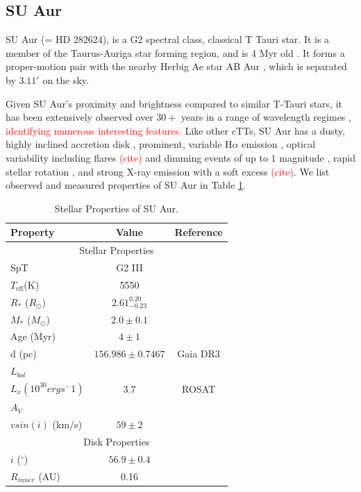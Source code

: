 \documentclass[twocolumn]{aastex631}
\renewcommand\deg{\ensuremath{^\circ}}
\newcommand\halpha{\ensuremath{{\text{H}\alpha}}}
\newcommand{\teff}{\ensuremath{T_{\text{eff}}}}
\newcommand{\citesomething}[1]{\textcolor{red}{(cite#1)}}
\newcommand{\red}[1]{\textcolor{red}{#1}}
\begin{document}
\subsection{SU Aur}
SU Aur (= HD 282624), is a G2 spectral class, classical T Tauri star. It is a member of the Taurus-Auriga star forming region, and is 4 Myr old \citep[e.g.][]{dewarf_intrinsic_2003}. It forms a proper-motion pair with the nearby Herbig Ae star AB Aur \citep{dewarf_intrinsic_2003}, which is separated by $3.11'$ on the sky.

Given SU Aur's proximity and brightness compared to similar T-Tauri stars, it has been extensively observed over $30+$ years in a range of wavelength regimes \citep[e.g.][]{giampapa_synoptic_1993, dewarf_intrinsic_2003, robrade_xmm-newton_2006, labdon_dusty_2019, labdon_imaging_2023}, \red{identifying numerous interesting features.} Like other cTTs, SU Aur has a dusty, highly inclined accretion disk \citep{akeson_observations_2005, labdon_dusty_2019, labdon_imaging_2023}, prominent, variable \halpha{} emission \citep[e.g.][]{giampapa_synoptic_1993}, optical variability including flares \citesomething{} and dimming events of up to $1$ magnitude \citep[e.g.][]{dewarf_stromgren_1998, grankin_su_aur_2018}, rapid stellar rotation \citep[e.g.][]{giampapa_synoptic_1993, unruh_multisite_2004}, and strong X-ray emission with a soft excess \citesomething{}. We list observed and measured properties of SU Aur in Table \ref{table:su_aur_properties}. 
    
\begin{table}[ht!]
    \centering
    \begin{tabular}{|l|c|c|}
    \hline
    Property & Value & Reference \\
    \hline
    \multicolumn{3}{|c|}{Stellar Properties}\\
    \hline
    SpT & G2 III & \cite{dewarf_intrinsic_2003} \\
    \teff (K) & 5550 & \cite{dewarf_intrinsic_2003} \\ 
    $R_*$ ($R_\odot$) & $2.61^{0.20}_{-0.23}$ & \cite{dewarf_intrinsic_2003} \\
    $M_*$ ($M_\odot$) & $2.0 \pm 0.1 $ & \cite{dewarf_intrinsic_2003} \\
    Age (Myr) & $4 \pm 1$ & \cite{dewarf_intrinsic_2003}\\
    d (pc) & $156.986 \pm 0.7467$ & Gaia DR3\\
    $L_{bol}$ & & \\
    $L_x (10^{30} erg s^-{1})$ & 3.7 & ROSAT \\
    $A_V$ & & \\
    $vsin(i)$ (km/s) & $59\pm2$ & \citet{nguyen_close_2012} \\
    \hline
    \multicolumn{3}{|c|}{Disk Properties} \\
    \hline
    $i$ (\deg) & $56.9 \pm 0.4$ & \cite{labdon_imaging_2023} \\
    $R_{inner}$ (AU) & 0.16 & \cite{labdon_imaging_2023} \\
    \hline   
    \end{tabular}
    \caption{Stellar Properties of SU Aur.}
    \label{table:su_aur_properties}
\end{table}
\end{document}
